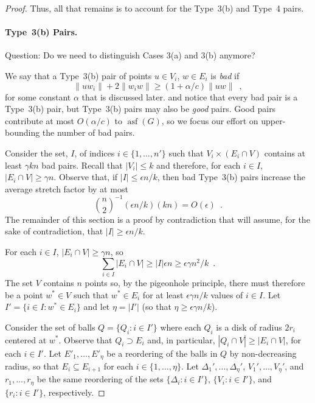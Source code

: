\documentclass{patmorin}
\DeclareMathOperator{\asf}{asf}
\begin{document}
\begin{proof}
  Thus, all that remains is to account for the Type~3(b) and Type~4 pairs.
  

  \paragraph{Type~3(b) Pairs.}  
  Question: Do we need to distinguish Cases 3(a) and 3(b) anymore?
  
  We say that a Type~3(b) pair of points $u\in V_i$, $w\in E_i$ is
  \emph{bad} if
  \[
      \|uw_i\|+2\|w_iw\| \ge (1+\alpha/c)\|uw\| \enspace ,
  \]
  for some constant $\alpha$ that is discussed later.  and notice that
  every bad pair is a Type~3(b) pair, but Type~3(b) pairs may also
  be \emph{good} pairs.  Good pairs contribute at most $O(\alpha/c)$
  to $\asf(G)$, so we focus our effort on upper-bounding the number of
  bad pairs.

  Consider the set, $I$, of indices $i\in\{1,\ldots,n'\}$ such that
  $V_i\times (E_i\cap V)$ contains at least $\gamma kn$ bad pairs.
  Recall that $|V_i|\le k$ and therefore, for each $i\in I$, $|E_i\cap
  V|\ge \gamma n$.  Observe that, if $|I|\le \epsilon n/k$, then bad
  Type~3(b) pairs increase the average stretch factor by at most
  \[
     \binom{n}{2}^{-1} (\epsilon n/k)(kn)  = O(\epsilon) \enspace .
  \]
  The remainder of this section is a proof by contradiction that will
  assume, for the sake of contradiction, that $|I|\ge \epsilon n/k$.

  For each $i\in I$, $|E_i\cap V|\ge \gamma n$, so
  \[
    \sum_{i\in I}|E_i\cap V|\ge|I|\epsilon n\ge \epsilon\gamma n^2/k \enspace .
  \]
  The set $V$ contains $n$ points so, by the pigeonhole principle, there
  must therefore be a point $w^*\in V$ such that $w^*\in E_i$ for at least
  $\epsilon\gamma n/k$ values of $i\in I$.  Let $I'=\{i\in I: w^*\in E_i\}$
  and let $\eta=|I'|$ (so that $\eta\ge \epsilon\gamma n/k$).

  Consider the set of balls $Q=\{ Q_{i}:i\in I'\}$ where each $Q_i$ is a
  disk of radius $2r_i$ centered at $w^*$.  Observe that $Q_i\supset E_i$
  and, in particular, $|Q_i\cap V|\ge |E_i\cap V|$, for each $i\in I'$.
  Let $E'_1,\ldots,E'_{\eta}$ be a reordering of the balls in $Q$
  by non-decreasing radius, so that $E_{i}\subseteq E_{i+1}$ for
  each $i\in\{1,\ldots,\eta\}$. Let $\Delta_1',\ldots,\Delta_{\eta}'$,
  $V_1',\ldots,V_{\eta}'$, and $r_1,\ldots,r_{\eta}$ be the same
  reordering of the sets $\{\Delta_i:i\in I'\}$, $\{V_i:i\in I'\}$,
  and $\{r_i:i\in I'\}$, respectively.


\end{proof}
\end{document}
